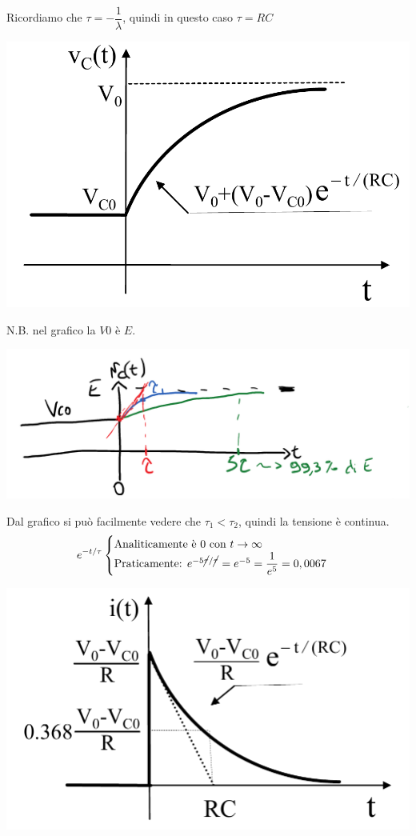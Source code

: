 \documentclass{article}
\begin{document}
Ricordiamo che $\tau = -\dfrac{1}{\lambda}$, quindi in questo caso $\tau = RC$
\begin{center}
    \includegraphics[scale=0.3]{Image/RC_2.png}
\end{center}
N.B. nel grafico la $V0$ è $E$.
\begin{center}
    \includegraphics[scale=0.18]{Image/RC_3.png}
\end{center}
Dal grafico si può facilmente vedere che $\tau_1<\tau_2$, quindi la tensione è continua.
\[
    e^{-t/\tau}
    \begin{cases}
        \text{Analiticamente è 0 con } t \rightarrow \infty\\
        \text{Praticamente: } e^{-5\cancel{\tau}/\cancel{\tau}} = e^{-5} = \dfrac{1}{e^5}=0,0067\\
    \end{cases}
\]
\begin{center}
    \includegraphics[scale=0.3]{Image/RC_4.png}
\end{center}
\end{document}
